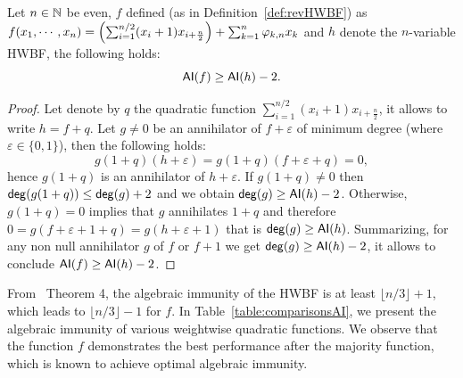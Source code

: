 \documentclass[11pt]{llncs}
\begin{document}
\begin{proposition}
	Let $n\in \mathbb{N}$ be even, $f$ defined (as in Definition~\ref{def:revHWBF}) as
	$f(x_1,\cdots,x_n)=\left(\sum_{i=1}^{n/2} (x_i+1) x_{i+\frac{n}{2}}\right) + \sum_{k=1}^n \varphi_{k,n} x_k$ and $h$ denote the $n$-variable HWBF, the following holds:
	\[\mathsf{AI}(f)\ge \mathsf{AI}(h)-2.\]
\end{proposition}
\begin{proof}
	Let denote by $q$ the quadratic function $\sum_{i=1}^{n/2} (x_i+1) x_{i+\frac{n}{2}}$, it allows to write $h=f+q$. 
	Let $g\neq 0$ be an annihilator of $f+ \varepsilon$ of minimum degree (where $\varepsilon \in \{0,1\}$), then the following holds:
	\[g (1+q) (h+\varepsilon) = g(1+q) (f+\varepsilon + q)=0, \]
	hence $g (1+q)$ is an annihilator of $h+ \varepsilon$. 
	If $g (1+q)\ne 0$ then $\mathsf{deg}(g(1+q)) \le \mathsf{deg}(g)+2$ and we obtain $\mathsf{deg}(g)\ge \mathsf{AI}(h) -2$. 
	Otherwise, $g (1+q)= 0$ implies that $g$ annihilates $1+q$ and therefore $0=g (f+\varepsilon + 1 +q)=g(h+ \varepsilon +1)$ that is $\mathsf{deg}(g)\ge \mathsf{AI}(h)$. 
	Summarizing, for any non null annihilator $g$ of $f$ or $f+1$ we get $\mathsf{deg}(g)\ge \mathsf{AI}(h)-2$, it allows to conclude $\mathsf{AI}(f)\ge \mathsf{AI}(h)-2$.
\end{proof}

From~\cite{DAM:WCST14} Theorem 4, the algebraic immunity of the HWBF is at least $\lfloor n/3\rfloor +1$, which leads to $\lfloor n/3\rfloor -1$ for $f$. 
In Table~\ref{table:comparisonsAI}, we present the algebraic immunity of various weightwise quadratic functions. We observe that the function $f$ demonstrates the best performance after the majority function, which is known to achieve optimal algebraic immunity.
\end{document}
